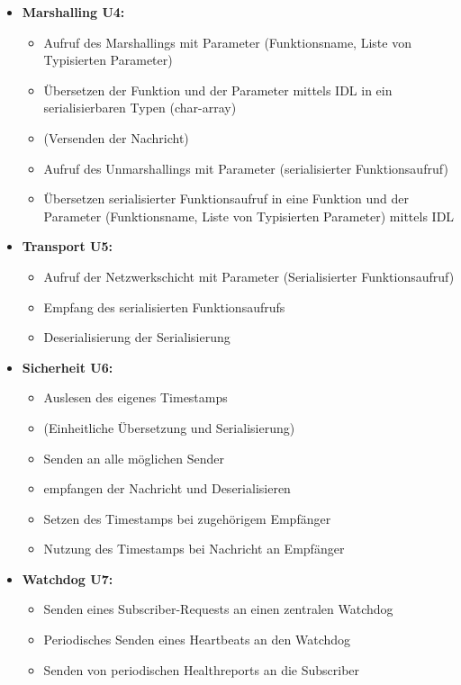 \begin{itemize}
	\item \textbf{Marshalling U4:}\\
	\begin{itemize}
		\item Aufruf des Marshallings mit Parameter (Funktionsname, Liste von Typisierten Parameter)
		\item Übersetzen der Funktion und der Parameter mittels IDL in ein serialisierbaren Typen (char-array)
		\item (Versenden der Nachricht)
		\item Aufruf des Unmarshallings mit Parameter (serialisierter Funktionsaufruf)
		\item Übersetzen serialisierter Funktionsaufruf in eine Funktion und der Parameter (Funktionsname, Liste von Typisierten Parameter) mittels IDL
	\end{itemize}
	
	\item \textbf{Transport U5:}\\
	\begin{itemize}
		\item Aufruf der Netzwerkschicht mit Parameter (Serialisierter Funktionsaufruf)
		\item Empfang des serialisierten Funktionsaufrufs
		\item Deserialisierung der Serialisierung
	\end{itemize}
	
	\item \textbf{Sicherheit U6:}\\
	\begin{itemize}
		\item Auslesen des eigenes Timestamps 	
		\item (Einheitliche Übersetzung und Serialisierung)
		\item Senden an alle möglichen Sender
		\item empfangen der Nachricht und Deserialisieren
		\item Setzen des Timestamps bei zugehörigem  Empfänger
		\item Nutzung des Timestamps bei Nachricht an Empfänger
	\end{itemize}
	
	\item \textbf{Watchdog U7:}\\
	\begin{itemize}
		\item Senden eines Subscriber-Requests an einen zentralen Watchdog
		\item Periodisches Senden eines Heartbeats an den Watchdog
		\item Senden von periodischen Healthreports an die Subscriber		
	\end{itemize}
\end{itemize}
	
